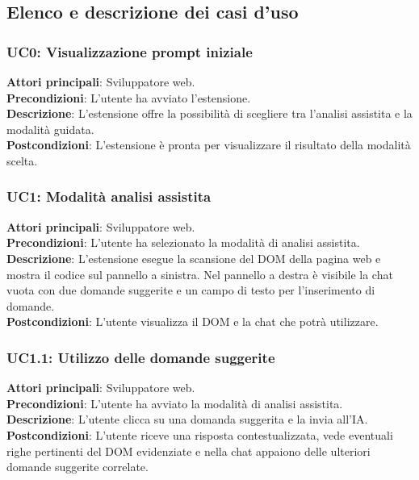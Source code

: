 \subsection{Elenco e descrizione dei casi d'uso}
\subsubsection*{UC0: Visualizzazione prompt iniziale}
\noindent \textbf{Attori principali}: Sviluppatore web.\\
\textbf{Precondizioni}: L'utente ha avviato l’estensione.\\
\textbf{Descrizione}: L’estensione offre la possibilità di scegliere tra l’analisi assistita e la modalità guidata.\\
\textbf{Postcondizioni}: L’estensione è pronta per visualizzare il risultato della modalità scelta.\\

\subsubsection*{UC1: Modalità analisi assistita}
\noindent \textbf{Attori principali}: Sviluppatore web.\\
\textbf{Precondizioni}: L’utente ha selezionato la modalità di analisi assistita.\\
\textbf{Descrizione}: L’estensione esegue la scansione del DOM della pagina web e mostra il codice sul pannello a sinistra. Nel pannello a destra è visibile la chat vuota con due domande suggerite e un campo di testo per l'inserimento di domande.\\
\textbf{Postcondizioni}: L’utente visualizza il DOM e la chat che potrà utilizzare.\\

\subsubsection*{UC1.1: Utilizzo delle domande suggerite}
\noindent \textbf{Attori principali}: Sviluppatore web.\\
\textbf{Precondizioni}: L’utente ha avviato la modalità di analisi assistita.\\
\textbf{Descrizione}: L’utente clicca su una domanda suggerita e la invia all'IA.\\
\textbf{Postcondizioni}: L’utente riceve una risposta contestualizzata, vede eventuali righe pertinenti del DOM evidenziate e nella chat appaiono delle ulteriori domande suggerite correlate.

